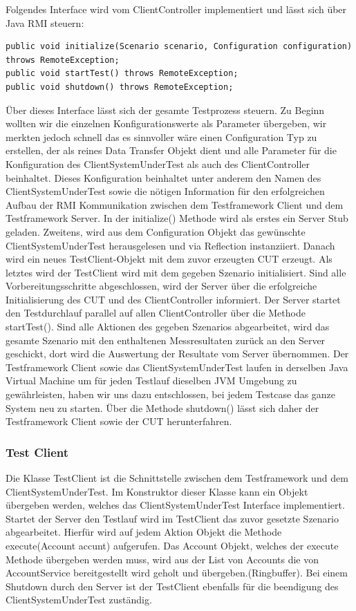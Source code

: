 Folgendes Interface wird vom ClientController implementiert und lässt sich über Java RMI steuern:
\begin{lstlisting}	
public void initialize(Scenario scenario, Configuration configuration) throws RemoteException;
public void startTest() throws RemoteException;
public void shutdown() throws RemoteException;
\end{lstlisting}
Über dieses Interface lässt sich der gesamte Testprozess steuern. Zu Beginn wollten wir die einzelnen Konfigurationswerte als Parameter übergeben, wir merkten jedoch schnell das es sinnvoller wäre einen Configuration Typ zu erstellen, der als reines Data Transfer Objekt dient und alle Parameter für die Konfiguration des ClientSystemUnderTest als auch des ClientController beinhaltet. Dieses Konfiguration beinhaltet unter anderem den Namen des ClientSystemUnderTest sowie die nötigen Information für den erfolgreichen Aufbau der RMI Kommunikation zwischen dem Testframework Client und dem Testframework Server. In der initialize() Methode wird als erstes ein Server Stub geladen. Zweitens, wird aus dem Configuration Objekt das gewünschte ClientSystemUnderTest herausgelesen und via Reflection instanziiert. Danach wird ein neues TestClient-Objekt mit dem zuvor erzeugten CUT erzeugt. Als letztes wird der TestClient wird mit dem gegeben Szenario initialisiert. Sind alle Vorbereitungsschritte abgeschlossen, wird der Server über die erfolgreiche Initialisierung des CUT und des ClientController informiert. Der Server startet den Testdurchlauf parallel auf allen ClientController über die Methode startTest(). Sind alle Aktionen des gegeben Szenarios abgearbeitet, wird das gesamte Szenario mit den enthaltenen Messresultaten zurück an den Server geschickt, dort wird die Auswertung der Resultate vom Server übernommen. Der Testframework Client sowie das ClientSystemUnderTest laufen in derselben Java Virtual Machine um für jeden Testlauf dieselben JVM Umgebung zu gewährleisten, haben wir uns dazu entschlossen, bei jedem Testcase das ganze System neu zu starten. Über die Methode shutdown() lässt sich daher der Testframework Client sowie der CUT herunterfahren.

\subsubsection{Test Client}
\label{sec:testclient}
Die Klasse TestClient ist die Schnittstelle zwischen dem Testframework und dem ClientSystemUnderTest. Im Konstruktor dieser Klasse kann ein Objekt übergeben werden, welches das ClientSystemUnderTest Interface implementiert. Startet der Server den Testlauf wird im TestClient das zuvor gesetzte Szenario abgearbeitet. Hierfür wird auf jedem Aktion Objekt die Methode execute(Account accunt) aufgerufen. Das Account Objekt, welches der execute Methode übergeben werden muss, wird aus der List von Accounts die von AccountService bereitgestellt wird geholt und übergeben.(Ringbuffer). Bei einem Shutdown durch den Server ist der TestClient ebenfalls für die beendigung des ClientSystemUnderTest zuständig.


